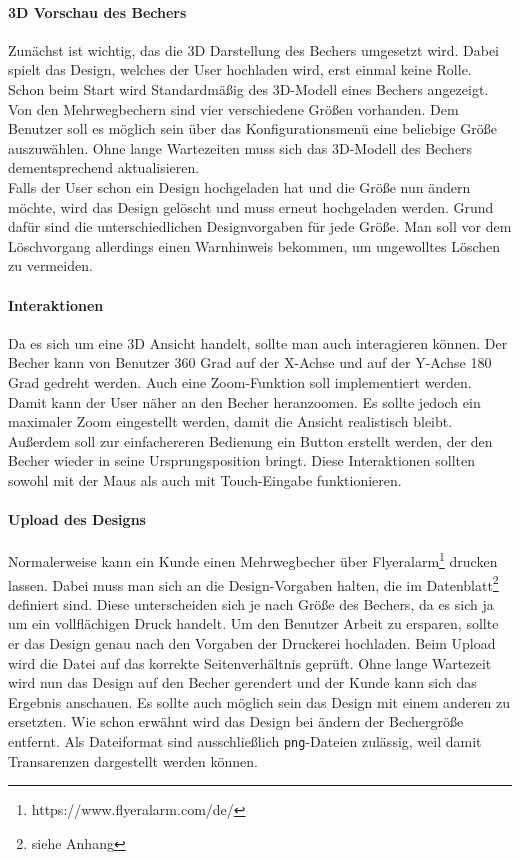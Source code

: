\paragraph{3D Vorschau des Bechers}
Zunächst ist wichtig, das die 3D Darstellung des Bechers umgesetzt wird. Dabei spielt das Design, welches der User hochladen wird, erst einmal keine Rolle. Schon beim Start wird Standardmäßig des 3D-Modell eines Bechers angezeigt. Von den Mehrwegbechern sind vier verschiedene Größen vorhanden. Dem Benutzer soll es möglich sein über das Konfigurationsmenü eine beliebige Größe auszuwählen. Ohne lange Wartezeiten muss sich das 3D-Modell des Bechers dementsprechend aktualisieren.\\
Falls der User schon ein Design hochgeladen hat und die Größe nun ändern möchte, wird das Design gelöscht und muss erneut hochgeladen werden. Grund dafür sind die unterschiedlichen Designvorgaben für jede Größe. Man soll vor dem Löschvorgang allerdings einen Warnhinweis bekommen, um ungewolltes Löschen zu vermeiden.
%
\paragraph{Interaktionen}
Da es sich um eine 3D Ansicht handelt, sollte man auch interagieren können. Der Becher kann von Benutzer 360 Grad auf der X-Achse und auf der Y-Achse 180 Grad gedreht werden. Auch eine Zoom-Funktion soll implementiert werden. Damit kann der User näher an den Becher heranzoomen. Es sollte jedoch ein maximaler Zoom eingestellt werden, damit die Ansicht realistisch bleibt. Außerdem soll zur einfachereren Bedienung ein Button erstellt werden, der den Becher wieder in seine Ursprungsposition bringt. Diese Interaktionen sollten sowohl mit der Maus als auch mit Touch-Eingabe funktionieren.
%
\paragraph{Upload des Designs}
Normalerweise kann ein Kunde einen Mehrwegbecher über Flyeralarm\footnote{https://www.flyeralarm.com/de/} drucken lassen. Dabei muss man sich an die Design-Vorgaben halten, die im Datenblatt\footnote{siehe Anhang} definiert sind. Diese unterscheiden sich je nach Größe des Bechers, da es sich ja um ein vollflächigen Druck handelt. Um den Benutzer Arbeit zu ersparen, sollte er das Design genau nach den Vorgaben der Druckerei hochladen. Beim Upload wird die Datei auf das korrekte Seitenverhältnis geprüft. Ohne lange Wartezeit wird nun das Design auf den Becher gerendert und der Kunde kann sich das Ergebnis anschauen. Es sollte auch möglich sein das Design mit einem anderen zu ersetzten. Wie schon erwähnt wird das Design bei ändern der Bechergröße entfernt. Als Dateiformat sind ausschließlich \texttt{png}-Dateien zulässig, weil damit Transarenzen dargestellt werden können.
%

